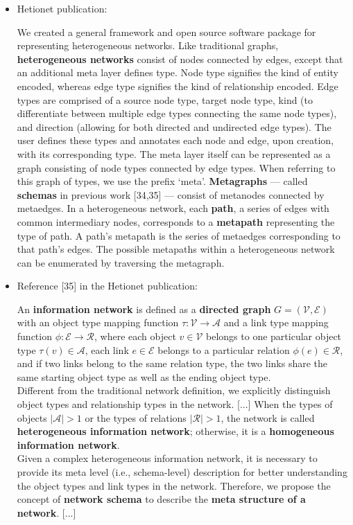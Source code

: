 \documentclass{article}
\begin{document}
\begin{itemize}
\item Hetionet publication:
\begin{displayquote}
We created a general framework and open source software package for representing heterogeneous networks. Like traditional graphs, \textbf{heterogeneous networks} consist of nodes connected by edges, except that an additional meta layer defines type. Node type signifies the kind of entity encoded, whereas edge type signifies the kind of relationship encoded. Edge types are comprised of a source node type, target node type, kind (to differentiate between multiple edge types connecting the same node types), and direction (allowing for both directed and undirected edge types). The user defines these types and annotates each node and edge, upon creation, with its corresponding type. The meta layer itself can be represented as a graph consisting of node types connected by edge types. When referring to this graph of types, we use the prefix ‘meta’. \textbf{Metagraphs} — called \textbf{schemas} in previous work [34,35] — consist of metanodes connected by metaedges. In a heterogeneous network, each \textbf{path}, a series of edges with common intermediary nodes, corresponds to a \textbf{metapath} representing the type of path. A path’s metapath is the series of metaedges corresponding to that path’s edges. The possible metapaths within a heterogeneous network can be enumerated by traversing the metagraph.
\end{displayquote}

\newpage
\item Reference [35] in the Hetionet publication:
\begin{displayquote}
An \textbf{information network} is defined as a \textbf{directed graph} $ G = (\mathcal{V}, \mathcal{E}) $ with an object type mapping function $ \tau : \mathcal{V} \rightarrow \mathcal{A} $ and a link type mapping function $ \phi : \mathcal{E} \rightarrow \mathcal{R} $, where each object $ v \in \mathcal{V} $ belongs to one particular object type $ \tau(v) \in \mathcal{A} $, each link $ e \in \mathcal{E} $ belongs to a particular relation $ \phi(e) \in \mathcal{R} $, and if two links belong to the same relation type, the two links share the same starting object type as well as the ending object type.\\
Different from the traditional network definition, we explicitly distinguish object types and
relationship types in the network. [...] When the types of objects $ |\mathcal{A}| > 1 $ or the types of relations $ |\mathcal{R}| > 1 $, the network is called \textbf{heterogeneous information network}; otherwise, it is a \textbf{homogeneous information network}.\\
Given a complex heterogeneous information network, it is necessary to provide its meta level (i.e., schema-level) description for better understanding the object types and link types in the network. Therefore, we propose the concept of \textbf{network schema} to describe the \textbf{meta structure of a network}. [...]


\end{displayquote}
\end{itemize}
\end{document}
